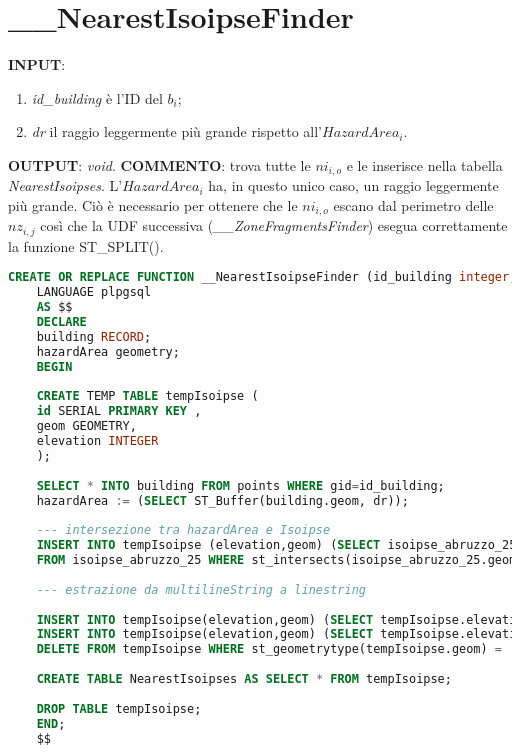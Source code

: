 \section{\_\_NearestIsoipseFinder}

\textbf{INPUT}: 
\begin{enumerate}
	\item \textit{id\_building} è l'ID del $b_i$;
	\item \textit{dr} il raggio leggermente più grande rispetto all'$HazardArea_i$.
\end{enumerate}
\textbf{OUTPUT}: \textit{void}. \newline
\textbf{COMMENTO}: trova tutte le $ni_{i,o}$ e le inserisce nella tabella \textit{NearestIsoipses}. L'$HazardArea_i$ ha, in questo unico caso, un raggio leggermente più grande. Ciò è necessario per ottenere che le $ni_{i,o}$ escano dal perimetro delle $nz_{i,j}$ così che la UDF successiva (\textit{\_\_ZoneFragmentsFinder}) esegua correttamente la funzione ST\_SPLIT(). 

\begin{lstlisting}[language=SQL]
	CREATE OR REPLACE FUNCTION __NearestIsoipseFinder (id_building integer, dr integer) RETURNS void
	LANGUAGE plpgsql
	AS $$
	DECLARE
	building RECORD;
	hazardArea geometry;
	BEGIN
	
	CREATE TEMP TABLE tempIsoipse (
	id SERIAL PRIMARY KEY ,
	geom GEOMETRY,
	elevation INTEGER
	);
	
	SELECT * INTO building FROM points WHERE gid=id_building;
	hazardArea := (SELECT ST_Buffer(building.geom, dr));
	
	--- intersezione tra hazardArea e Isoipse
	INSERT INTO tempIsoipse (elevation,geom) (SELECT isoipse_abruzzo_25.elevation,st_intersection(isoipse_abruzzo_25.geom,hazardArea) as geom
	FROM isoipse_abruzzo_25 WHERE st_intersects(isoipse_abruzzo_25.geom,hazardArea));
	
	--- estrazione da multilineString a linestring
	
	INSERT INTO tempIsoipse(elevation,geom) (SELECT tempIsoipse.elevation,(st_dump(tempIsoipse.geom)).geom FROM tempIsoipse WHERE st_geometrytype(tempIsoipse.geom) = 'ST_MultiLineString') ;
	INSERT INTO tempIsoipse(elevation,geom) (SELECT tempIsoipse.elevation, st_linemerge(tempIsoipse.geom) FROM tempIsoipse WHERE st_geometrytype(tempIsoipse.geom) = 'ST_MultiLineString');
	DELETE FROM tempIsoipse WHERE st_geometrytype(tempIsoipse.geom) = 'ST_MultiLineString';
	
	CREATE TABLE NearestIsoipses AS SELECT * FROM tempIsoipse;
	
	DROP TABLE tempIsoipse;
	END;
	$$
\end{lstlisting}

